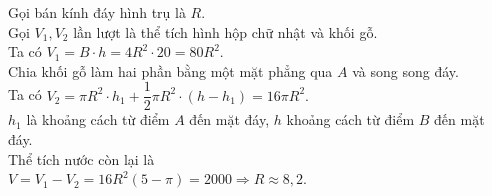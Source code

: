 \begin{ex}
{\begin{center}
		\end{center}
		Gọi bán kính đáy hình trụ là $R$.\\
		Gọi $V_1,V_2$ lần lượt là thể tích hình hộp chữ nhật và khối gỗ.\\
		Ta có $V_1=B\cdot h=4R^2\cdot 20=80R^2$.\\
		Chia khối gỗ làm hai phần bằng một mặt phẳng qua $A$ và song song đáy.\\
		Ta có $V_2=\pi{R^2}\cdot h_1+\dfrac{1}{2}\pi{R^2}\cdot \left(h-h_1\right)=16\pi{R^2}.$\\
		$h_1$ là khoảng cách từ điểm $A$ đến mặt đáy, $h$ khoảng cách từ điểm $B$ đến mặt đáy.\\
		Thể tích nước còn lại là\\
		$V=V_1-V_2=16R^2\left(5-\pi\right)=2000\Rightarrow R\approx 8,2$.}
\end{ex}

